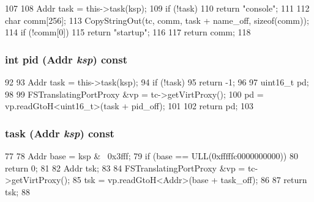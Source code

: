 \begin{DoxyCode}
107 {
108     Addr task = this->task(ksp);
109     if (!task)
110         return "console";
111 
112     char comm[256];
113     CopyStringOut(tc, comm, task + name_off, sizeof(comm));
114     if (!comm[0])
115         return "startup";
116 
117     return comm;
118 }
\end{DoxyCode}
\hypertarget{classAlphaISA_1_1ProcessInfo_a27d14b3fdb576a4081e5c58c55375042}{
\subsubsection[{pid}]{\setlength{\rightskip}{0pt plus 5cm}int pid ({\bf Addr} {\em ksp}) const}}
\label{classAlphaISA_1_1ProcessInfo_a27d14b3fdb576a4081e5c58c55375042}



\begin{DoxyCode}
92 {
93     Addr task = this->task(ksp);
94     if (!task)
95         return -1;
96 
97     uint16_t pd;
98 
99     FSTranslatingPortProxy &vp = tc->getVirtProxy();
100     pd = vp.readGtoH<uint16_t>(task + pid_off);
101 
102     return pd;
103 }
\end{DoxyCode}
\hypertarget{classAlphaISA_1_1ProcessInfo_a05de971c556b8e4418a60289f92dfba3}{
\subsubsection[{task}]{ task ({\bf Addr} {\em ksp}) const}}
\label{classAlphaISA_1_1ProcessInfo_a05de971c556b8e4418a60289f92dfba3}



\begin{DoxyCode}
77 {
78     Addr base = ksp & ~0x3fff;
79     if (base == ULL(0xfffffc0000000000))
80         return 0;
81 
82     Addr tsk;
83 
84     FSTranslatingPortProxy &vp = tc->getVirtProxy();
85     tsk = vp.readGtoH<Addr>(base + task_off);
86 
87     return tsk;
88 }
\end{DoxyCode}


